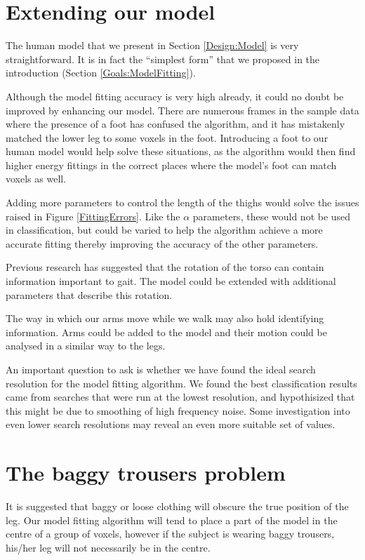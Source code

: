 \section{Extending our model}

The human model that we present in Section \ref{Design:Model} is very straightforward.
It is in fact the ``simplest form'' that we proposed in the introduction (Section \ref{Goals:ModelFitting}).

Although the model fitting accuracy is very high already, it could no doubt be improved by enhancing our model.
There are numerous frames in the sample data where the presence of a foot has confused the algorithm, and it has mistakenly matched the lower leg to some voxels in the foot.
Introducing a foot to our human model would help solve these situations, as the algorithm would then find higher energy fittings in the correct places where the model's foot can match voxels as well.

Adding more parameters to control the length of the thighs would solve the issues raised in Figure \ref{FittingErrors}.
Like the $\alpha$ parameters, these would not be used in classification, but could be varied to help the algorithm achieve a more accurate fitting thereby improving the accuracy of the other parameters.

Previous research has suggested that the rotation of the torso can contain information important to gait.
The model could be extended with additional parameters that describe this rotation.

The way in which our arms move while we walk may also hold identifying information.
Arms could be added to the model and their motion could be analysed in a similar way to the legs.

An important question to ask is whether we have found the ideal search resolution for the model fitting algorithm.
We found the best classification results came from searches that were run at the lowest resolution, and hypothisized that this might be due to smoothing of high frequency noise.
Some investigation into even lower search resolutions may reveal an even more suitable set of values.


\section{The baggy trousers problem}
\label{FutureWork:BaggyTrousers}

It is suggested that baggy or loose clothing will obscure the true position of the leg.
Our model fitting algorithm will tend to place a part of the model in the centre of a group of voxels, however if the subject is wearing baggy trousers, his/her leg will not necessarily be in the centre.

